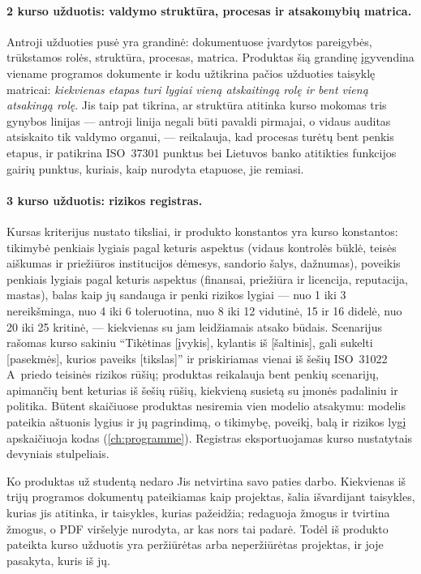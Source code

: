 \paragraph{2 kurso užduotis: valdymo struktūra, procesas ir atsakomybių matrica.} Antroji
užduoties pusė yra grandinė: dokumentuose įvardytos pareigybės, trūkstamos rolės, struktūra,
procesas, matrica. Produktas šią grandinę įgyvendina viename programos dokumente ir kodu
užtikrina pačios užduoties taisyklę matricai: \emph{kiekvienas etapas turi lygiai vieną
atskaitingą rolę ir bent vieną atsakingą rolę}. Jis taip pat tikrina, ar struktūra atitinka
kurso mokomas tris gynybos linijas --- antroji linija negali būti pavaldi pirmajai, o vidaus
auditas atsiskaito tik valdymo organui, --- reikalauja, kad procesas turėtų bent penkis etapus,
ir patikrina ISO~37301 punktus bei Lietuvos banko atitikties funkcijos gairių punktus, kuriais,
kaip nurodyta etapuose, jie remiasi.

\paragraph{3 kurso užduotis: rizikos registras.} Kursas kriterijus nustato tiksliai, ir
produkto konstantos yra kurso konstantos: tikimybė penkiais lygiais pagal keturis aspektus
(vidaus kontrolės būklė, teisės aiškumas ir priežiūros institucijos dėmesys, sandorio šalys,
dažnumas), poveikis penkiais lygiais pagal keturis aspektus (finansai, priežiūra ir
licencija, reputacija, mastas), balas kaip jų sandauga ir penki rizikos lygiai --- nuo 1 iki 3
nereikšminga, nuo 4 iki 6 toleruotina, nuo 8 iki 12 vidutinė, 15 ir 16 didelė, nuo 20 iki 25
kritinė, --- kiekvienas su jam leidžiamais atsako būdais. Scenarijus rašomas kurso sakiniu
\enquote{Tikėtinas [įvykis], kylantis iš [šaltinis], gali sukelti [pasekmės], kurios paveiks
[tikslas]} ir priskiriamas vienai iš šešių ISO~31022 A~priedo teisinės rizikos rūšių; produktas
reikalauja bent penkių scenarijų, apimančių bent keturias iš šešių rūšių, kiekvieną susietą su
įmonės padaliniu ir politika. Būtent skaičiuose produktas nesiremia vien modelio atsakymu:
modelis pateikia aštuonis lygius ir jų pagrindimą, o tikimybę, poveikį, balą ir rizikos lygį
apskaičiuoja kodas (\cref{ch:programme}). Registras eksportuojamas kurso nustatytais devyniais
stulpeliais.

\begin{humanbox}{Ko produktas už studentą nedaro}
Jis netvirtina savo paties darbo. Kiekvienas iš trijų programos dokumentų pateikiamas kaip
projektas, šalia išvardijant taisykles, kurias jis atitinka, ir taisykles, kurias pažeidžia;
redaguoja žmogus ir tvirtina žmogus, o PDF viršelyje nurodyta, ar kas nors tai padarė. Todėl iš
produkto pateikta kurso užduotis yra peržiūrėtas arba neperžiūrėtas projektas, ir joje pasakyta,
kuris iš jų.
\end{humanbox}

